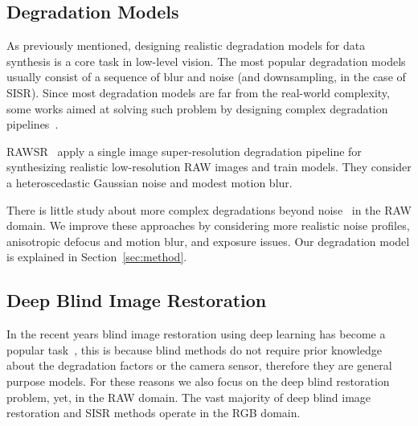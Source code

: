\documentclass{article}
\begin{document}
\vspace{-2mm}
\subsection{Degradation Models}
\label{ssc:degradation_models}

As previously mentioned, designing realistic degradation models for data synthesis is a core task in low-level vision. The most popular degradation models usually consist of a sequence of blur and noise (and downsampling, in the case of SISR). Since most degradation models are far from the real-world complexity, some works aimed at solving such problem by designing complex degradation pipelines~\cite{xu2019rawsr}.


RAWSR~\cite{xu2019rawsr, xu2020exploiting} apply a single image super-resolution degradation pipeline for synthesizing realistic low-resolution RAW images and train models. They consider a heteroscedastic Gaussian noise and modest motion blur.

There is little study about more complex degradations beyond noise~\cite{hasinoff2014photon, liang2020raw} in the RAW domain. We improve these approaches by considering more realistic noise profiles, anisotropic defocus and motion blur, and exposure issues. Our degradation model is explained in Section~\ref{sec:method}.

\vspace{-2mm}
\subsection{Deep Blind Image Restoration}
\label{ssc:flexible_SISR}

In the recent years blind image restoration using deep learning has become a popular task~\cite{kai2017dncnn, nah2017Gopro, zhang2021DPIR, kai2021bsrgan, zamir2022restormer, chen2022simple}, this is because blind methods do not require prior knowledge about the degradation factors or the camera sensor, therefore they are general purpose models. For these reasons we also focus on the deep blind restoration problem, yet, in the RAW domain.
%
The vast majority of deep blind image restoration and SISR methods operate in the RGB domain. 

\vspace{2mm}
\end{document}
